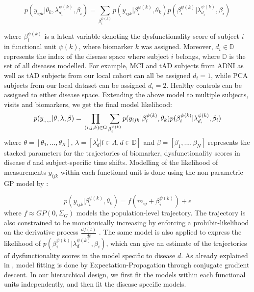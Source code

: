 \documentclass{llncs}
\begin{document}
\begin{equation}
 p(y_{ijk}|\theta_k, \lambda_{d_i}^{\psi(k)}, \beta_i) = \sum_{\beta_i^{\psi(k)}} p(y_{ijk}| \beta_i^{\psi(k)}, \theta_k) p(\beta_i^{\psi(k)}| \lambda_{d_i}^{\psi(k)}, \beta_i)
\end{equation}

where $\beta_i^{\psi(k)}$ is a latent variable denoting the dysfunctionality score of subject $i$ in functional unit $\psi(k)$, where biomarker $k$ was assigned. Moreover, $d_i \in \mathbb{D}$ represents the index of the disease space where subject $i$ belongs, where $\mathbb{D}$ is the set of all diseases modelled. For example, MCI and tAD subjects from ADNI as well as tAD subjects from our local cohort can all be assigned $d_i=1$, while PCA subjects from our local dataset can be assigned $d_i=2$. Healthy controls can be assigned to either disease space. Extending the above model to multiple subjects, visits and biomarkers, we get the final model likelihood:
\begin{equation}
 p(y_{.,.,.}|\theta, \lambda, \beta) = \\ \prod_{(i,j,k) \in \Omega} \sum_{\beta_i^{\psi(k)}} p(y_{ijk}| \beta_i^{\psi(k)}, \theta_k) p(\beta_i^{\psi(k)}| \lambda_{d_i}^{\psi(k)}, \beta_i)
\end{equation}
where $\theta = [\theta_1, ..., \theta_K]$, $\lambda = [\lambda_d^{l}|l \in \Lambda, d \in \mathbb{D}]$ and $\beta =[\beta_1, ..., \beta_N]$ represents the stacked parameters for the trajectories of biomarker, dysfunctionality scores in disease $d$ and subject-specific time shifts. Modelling of the likelihood of measurements $y_{ijk}$ within each functional unit is done using the non-parametric GP model by \cite{lorenzi2017disease}:

\begin{equation}
p(y_{ijk}| \beta_i^{\psi(k)}, \theta_k) = f(m_{ij} + \beta_i^{\psi(k)}) + \epsilon
\end{equation}
where $f \approx GP(0, \Sigma_G)$ models the population-level trajectory. The trajectory is also constrained to be monotonically increasing by enforcing a prohibit-likelihood on the derivative process $\frac{df(t)}{dt}$ \cite{lorenzi2017disease}. The same model is also applied to express the likelihood of $p(\beta_i^{\psi(k)}| \lambda_d^{\psi(k)}, \beta_i)$, which can give an estimate of the trajectories of dysfunctionality scores in the model specific to disease $d$. As already explained in \cite{lorenzi2017disease}, model fitting is done by Expectation-Propagation through conjugate gradient descent. In our hierarchical design, we first fit the models within each functional units independently, and then fit the disease specific models.
\end{document}
